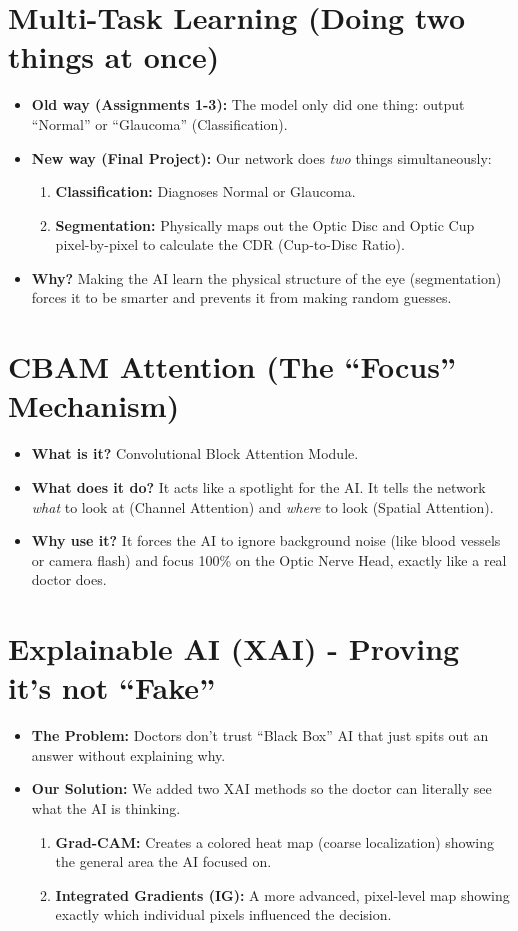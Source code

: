 \documentclass[11pt,a4paper]{article}
\begin{document}
\section{Multi-Task Learning (Doing two things at once)}
\begin{itemize}
    \item \textbf{Old way (Assignments 1-3):} The model only did one thing: output ``Normal'' or ``Glaucoma'' (Classification).
    \item \textbf{New way (Final Project):} Our network does \textit{two} things simultaneously:
    \begin{enumerate}
        \item \textbf{Classification:} Diagnoses Normal or Glaucoma.
        \item \textbf{Segmentation:} Physically maps out the Optic Disc and Optic Cup pixel-by-pixel to calculate the CDR (Cup-to-Disc Ratio).
    \end{enumerate}
    \item \textbf{Why?} Making the AI learn the physical structure of the eye (segmentation) forces it to be smarter and prevents it from making random guesses.
\end{itemize}

\section{CBAM Attention (The ``Focus'' Mechanism)}
\begin{itemize}
    \item \textbf{What is it?} Convolutional Block Attention Module.
    \item \textbf{What does it do?} It acts like a spotlight for the AI. It tells the network \textit{what} to look at (Channel Attention) and \textit{where} to look (Spatial Attention).
    \item \textbf{Why use it?} It forces the AI to ignore background noise (like blood vessels or camera flash) and focus 100\% on the Optic Nerve Head, exactly like a real doctor does.
\end{itemize}

\section{Explainable AI (XAI) - Proving it's not ``Fake''}
\begin{itemize}
    \item \textbf{The Problem:} Doctors don't trust ``Black Box'' AI that just spits out an answer without explaining why.
    \item \textbf{Our Solution:} We added two XAI methods so the doctor can literally see what the AI is thinking.
    \begin{enumerate}
        \item \textbf{Grad-CAM:} Creates a colored heat map (coarse localization) showing the general area the AI focused on.
        \item \textbf{Integrated Gradients (IG):} A more advanced, pixel-level map showing exactly which individual pixels influenced the decision.
    \end{enumerate}
\end{itemize}
\end{document}
